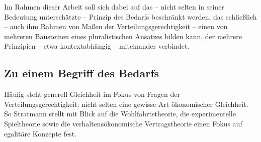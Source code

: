 \documentclass[a4paper]{thesis}
\begin{document}
Im Rahmen dieser Arbeit soll sich dabei auf das -- nicht selten in seiner Bedeutung unterschätzte -- Prinzip des Bedarfs beschränkt werden, das schließlich -- auch ihm Rahmen von Maßen der Verteilungsgerechtigkeit -- einen von mehreren Bausteinen eines pluralistischen Ansatzes bilden kann, der mehrere Prinzipien -- etwa kontextabhängig -- miteinander verbindet.

\subsection{Zu einem Begriff des Bedarfs}
Häufig steht generell Gleichheit im Fokus von Fragen der Verteilungsgerechtigkeit; nicht selten eine gewisse Art ökonomischer Gleichheit. So Stratmann stellt mit Blick auf die Wohlfahrtstheorie, die experimentelle Spieltheorie sowie die verhaltensökonomische Vertragstheorie einen Fokus auf egalitäre Konzepte fest.
\end{document}
